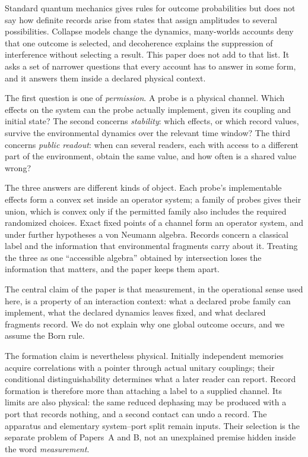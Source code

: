 \documentclass[12pt,a4paper]{article}
\begin{document}
Standard quantum mechanics gives rules for outcome probabilities but does not say how definite records arise from states that assign amplitudes to several possibilities. Collapse models change the dynamics, many-worlds accounts deny that one outcome is selected, and decoherence explains the suppression of interference without selecting a result. This paper does not add to that list. It asks a set of narrower questions that every account has to answer in some form, and it answers them inside a declared physical context.

The first question is one of \emph{permission}. A probe is a physical channel. Which effects on the system can the probe actually implement, given its coupling and initial state? The second concerns \emph{stability}: which effects, or which record values, survive the environmental dynamics over the relevant time window? The third concerns \emph{public readout}: when can several readers, each with access to a different part of the environment, obtain the same value, and how often is a shared value wrong?

The three answers are different kinds of object. Each probe's implementable effects form a convex set inside an operator system; a family of probes gives their union, which is convex only if the permitted family also includes the required randomized choices. Exact fixed points of a channel form an operator system, and under further hypotheses a von Neumann algebra. Records concern a classical label and the information that environmental fragments carry about it. Treating the three as one ``accessible algebra'' obtained by intersection loses the information that matters, and the paper keeps them apart.

The central claim of the paper is that measurement, in the operational sense used here, is a property of an interaction context: what a declared probe family can implement, what the declared dynamics leaves fixed, and what declared fragments record. We do not explain why one global outcome occurs, and we assume the Born rule.

The formation claim is nevertheless physical. Initially independent
memories acquire correlations with a pointer through actual unitary
couplings; their conditional distinguishability determines what a later
reader can report. Record formation is therefore more than attaching a
label to a supplied channel. Its limits are also physical: the same
reduced dephasing may be produced with a port that records nothing,
and a second contact can undo a record. The apparatus and elementary
system--port split remain inputs. Their selection is the separate
problem of Papers~A and B, not an unexplained premise hidden inside
the word \emph{measurement}.
\end{document}
